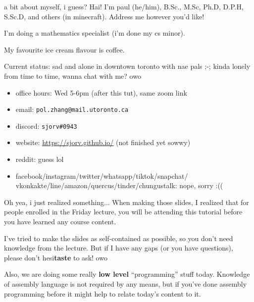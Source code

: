\documentclass{beamer}
\begin{document}
\begin{frame}{a bit about myself, i guess?}
Hai! I'm paul (he/him), B.Sc., M.Sc, Ph.D, D.P.H, S.Sc.D, and others (in minecraft). Address me however you'd like!

\vspace{2mm}

I'm doing a mathematics specialist (i'm done my cs minor).

My favourite ice cream flavour is coffee.

\vspace{2mm}

Current status: sad and alone in downtown toronto with nae pals ;-;
kinda lonely from time to time, wanna chat with me? owo
\begin{itemize}
\item office hours: Wed 5-6pm (after this tut), same zoom link
\item email: \texttt{pol.zhang@mail.utoronto.ca}
\item discord: \texttt{sjorv\#0943}
\item website: \url{https://sjorv.github.io/} (not finished yet sowwy)
\item reddit: guess lol
\item facebook/instagram/twitter/whatsapp/tiktok/snapchat/\\
vkonkakte/line/amazon/quercus/tinder/chungustalk: nope, sorry :((
\end{itemize}
  
\end{frame}

\begin{frame}{Oh yea, i just realized something...}
When making those slides, I realized that for people enrolled in the Friday lecture, you will be attending this tutorial before you have learned any course content.

\vspace{2mm}

I've tried to make the slides as self-contained as possible, so you don't need knowledge from the lecture. But if I have any gaps (or you have questions), please don't hesi\textbf{taste} to ask! owo

\vspace{2mm}

Also, we are doing some really \textbf{low level} ``programming'' stuff today. Knowledge of assembly language is not required by any means, but if you've done assembly programming before it might help to relate today's content to it.
\end{frame}
\end{document}
